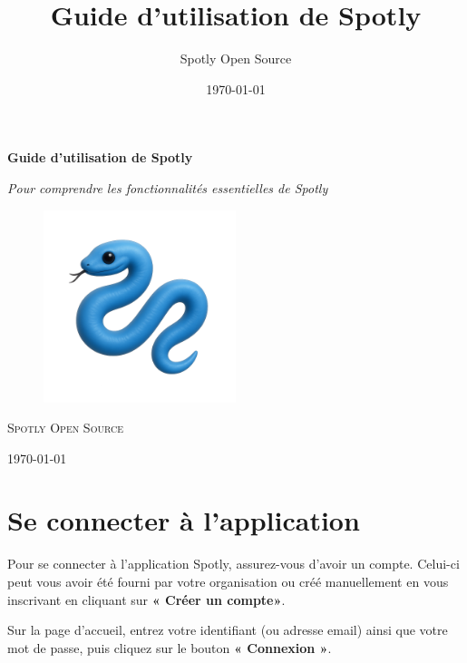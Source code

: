 \documentclass[a4paper,12pt]{article}
\title{\Huge \textbf{Guide d'utilisation de Spotly}}
\author{\large Spotly Open Source}
\date{\today}
\begin{document}
\begin{titlepage}
    \centering
    \vspace*{3cm}
    {\Huge\bfseries Guide d'utilisation de Spotly \par}
    \vspace{2cm}
    {\Large\itshape Pour comprendre les fonctionnalités essentielles de Spotly\par}
    
\begin{figure}[h!]
    \centering
    \includegraphics[width=0.5\textwidth]{LOGO.png}
    
\end{figure}
    \vfill
    {\large\scshape Spotly Open Source \par}
    \vspace{0.5cm}
    {\large\today\par}
\end{titlepage}

\tableofcontents
\newpage

\section{Se connecter à l'application}

Pour se connecter à l'application Spotly, assurez-vous d’avoir un compte. Celui-ci peut vous avoir été fourni par votre organisation ou créé manuellement en vous inscrivant en cliquant sur \textbf{« Créer un compte»}.

Sur la page d’accueil, entrez votre identifiant (ou adresse email) ainsi que votre mot de passe, puis cliquez sur le bouton \textbf{« Connexion »}.
\end{document}
